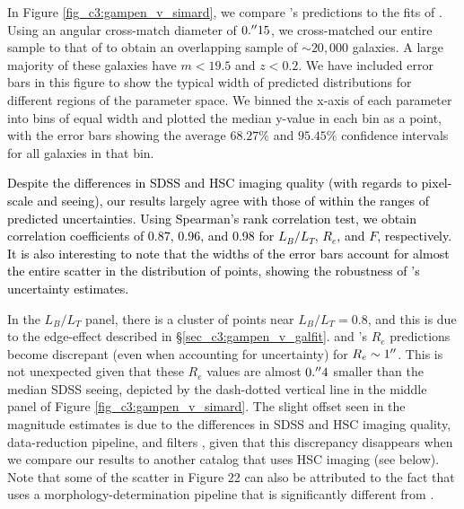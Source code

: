 In Figure \ref{fig_c3:gampen_v_simard}, we compare \gampen{}'s predictions to the fits of \citet{simard_11}. Using an angular cross-match diameter of $0.\mbox{$^{\prime\prime}$}15$, we cross-matched our entire sample to that of \citet{simard_11} to obtain an overlapping sample of $\sim20,000$ galaxies. A large majority of these galaxies have $m < 19.5$ and $z < 0.2$. We have included error bars in this figure to show the typical width of predicted distributions for different regions of the parameter space. We binned the x-axis of each parameter into bins of equal width and plotted the median y-value in each bin as a point, with the error bars showing the average $68.27\%$ and $95.45\%$ confidence intervals for all galaxies in that bin. 

\textcolor{black}{Despite the differences in SDSS and HSC imaging quality (with regards to pixel-scale and seeing), our results largely agree with those of \citet{simard_11} within the ranges of predicted uncertainties. Using Spearman's rank correlation test, we obtain correlation coefficients of 0.87, 0.96, and 0.98 for $L_B/L_T$, $R_e$, and $F$, respectively. It is also interesting to note that the widths of the error bars account for almost the entire scatter in the distribution of points, showing the robustness of \gampen{}'s uncertainty estimates.}

In the $L_B/L_T$ panel, there is a cluster of points near $L_B/L_T = 0.8$, and this is due to the edge-effect described in \S \ref{sec_c3:gampen_v_galfit}. \gampen{} and \citet{simard_11}'s $R_e$ predictions become discrepant (even when accounting for uncertainty) for $R_e \sim 1\mbox{$^{\prime\prime}$}$. This is not unexpected given that these $R_e$ values are almost $0.\mbox{$^{\prime\prime}$}4$ smaller than the median SDSS seeing, depicted by the dash-dotted vertical line in the middle panel of Figure \ref{fig_c3:gampen_v_simard}. The slight offset seen in the magnitude estimates is due to the differences in SDSS and HSC imaging quality, data-reduction pipeline, and filters \citep{hsc_filters}, given that this discrepancy disappears when we compare our results to another catalog that uses HSC imaging (see below). Note that some of the scatter in Figure 22 can also be attributed to the fact that \citet{simard_11} uses a morphology-determination pipeline that is significantly different from \gampen{}.

